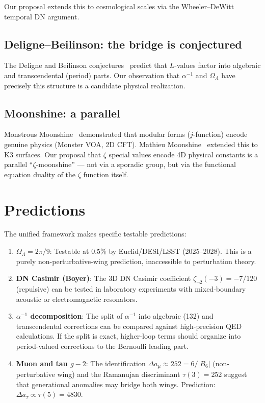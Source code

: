 \documentclass[11pt,a4paper]{article}
\begin{document}
Our proposal extends this to cosmological scales via the
Wheeler--DeWitt temporal DN argument.

\subsection{Deligne--Beilinson: the bridge is conjectured}

The Deligne and Beilinson conjectures~\cite{Deligne1979,Beilinson1984}
predict that $L$-values factor into algebraic and transcendental
(period) parts. Our observation that $\alpha^{-1}$ and
$\Omega_\Lambda$ have precisely this structure is a candidate
physical realization.

\subsection{Moonshine: a parallel}

Monstrous Moonshine~\cite{Borcherds1992} demonstrated that
modular forms ($j$-function) encode genuine physics (Monster VOA,
2D CFT). Mathieu Moonshine~\cite{EOT2010} extended this to K3
surfaces. Our proposal that $\zeta$ special values encode 4D
physical constants is a parallel ``$\zeta$-moonshine'' --- not
via a sporadic group, but via the functional equation duality of
the $\zeta$ function itself.

\section{Predictions}

The unified framework makes specific testable predictions:

\begin{enumerate}
\item \textbf{$\Omega_\Lambda = 2\pi/9$}: Testable at $0.5\%$
by Euclid/DESI/LSST (2025--2028). This is a purely
non-perturbative-wing prediction, inaccessible to perturbation
theory.

\item \textbf{DN Casimir (Boyer)}: The 3D DN Casimir coefficient
$\zeta_{\neg 2}(-3) = -7/120$ (repulsive) can be tested in
laboratory experiments with mixed-boundary acoustic or
electromagnetic resonators.

\item \textbf{$\alpha^{-1}$ decomposition}: The split of
$\alpha^{-1}$ into algebraic (132) and transcendental
corrections can be compared against high-precision QED
calculations. If the split is exact, higher-loop terms should
organize into period-valued corrections to the Bernoulli
leading part.

\item \textbf{Muon and tau $g-2$}: The identification
$\Delta a_\mu \approx 252 = 6/|B_6|$ (non-perturbative wing)
and the Ramanujan discriminant $\tau(3) = 252$ suggest that
generational anomalies may bridge both wings. Prediction:
$\Delta a_\tau \propto \tau(5) = 4830$.
\end{enumerate}
\end{document}
